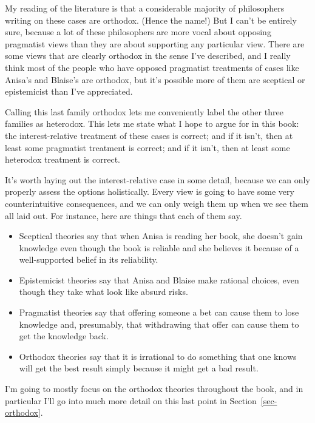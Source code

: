 \documentclass[
  10pt,
  letterpaper,
  twoside]{scrbook}
\providecommand{\tightlist}{%
  \setlength{\itemsep}{0pt}\setlength{\parskip}{0pt}}\usepackage{longtable,booktabs,array}
\begin{document}
My reading of the literature is that a considerable majority of
philosophers writing on these cases are orthodox. (Hence the name!) But
I can't be entirely sure, because a lot of these philosophers are more
vocal about opposing pragmatist views than they are about supporting any
particular view. There are some views that are clearly orthodox in the
sense I've described, and I really think most of the people who have
opposed pragmatist treatments of cases like Anisa's and Blaise's are
orthodox, but it's possible more of them are sceptical or epistemicist
than I've appreciated.

Calling this last family orthodox lets me conveniently label the other
three families as heterodox. This lets me state what I hope to argue for
in this book: the interest-relative treatment of these cases is correct;
and if it isn't, then at least some pragmatist treatment is correct; and
if it isn't, then at least some heterodox treatment is correct.

It's worth laying out the interest-relative case in some detail, because
we can only properly assess the options holistically. Every view is
going to have some very counterintuitive consequences, and we can only
weigh them up when we see them all laid out. For instance, here are
things that each of them say.

\begin{itemize}
\tightlist
\item
  Sceptical theories say that when Anisa is reading her book, she
  doesn't gain knowledge even though the book is reliable and she
  believes it because of a well-supported belief in its reliability.
\item
  Epistemicist theories say that Anisa and Blaise make rational choices,
  even though they take what look like absurd risks.
\item
  Pragmatist theories say that offering someone a bet can cause them to
  lose knowledge and, presumably, that withdrawing that offer can cause
  them to get the knowledge back.
\item
  Orthodox theories say that it is irrational to do something that one
  knows will get the best result simply because it might get a bad
  result.
\end{itemize}

I'm going to mostly focus on the orthodox theories throughout the book,
and in particular I'll go into much more detail on this last point in
Section~\ref{sec-orthodox}.
\end{document}
